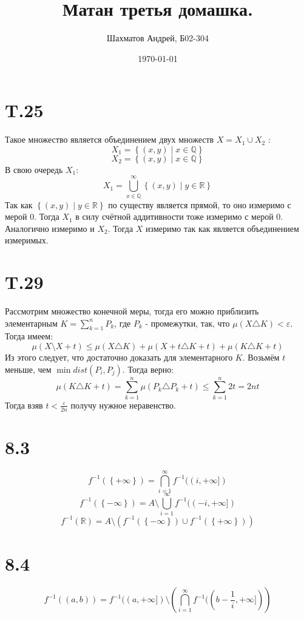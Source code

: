 \documentclass[12pt]{article}
\title{Матан третья домашка.}
\author{Шахматов Андрей, Б02-304}
\date{\today}
\begin{document}
\maketitle
\tableofcontents

\section{T.25}
Такое множество является объединением двух множеств $X = X_1 \cup X_2$ : 
\[
    X_1 = \left\{ (x, y) \mid x \in \mathbb{Q} \right\} 
\]
\[
    X_2 = \left\{ (x, y) \mid x \in \mathbb{Q} \right\}
\]
В свою очередь $X_1$:
\[
    X_1 = \bigcup_{x \in \mathbb{Q}}^{\infty} \left\{ (x, y) \mid y \in \mathbb{R} \right\}   
\]  
Так как $\left\{ (x, y) \mid y \in \mathbb{R} \right\}$ по существу является прямой, то оно измеримо 
с мерой $0$. Тогда $X_1$ в силу счётной аддитивности тоже измеримо с мерой $0$. Аналогично измеримо 
и $X_2$. Тогда $X$ измеримо так как является объединением измеримых.   
\section{T.29}
Рассмотрим множество конечной меры, тогда его можно приблизить элементарным $K = \sum_{k=1}^{n} P_k$, 
где $P_k$ - промежутки, так, что $\mu(X \triangle K) < \varepsilon$. 
Тогда имеем: 
\[
    \mu(X \setminus X + t) \leq \mu (X \triangle K) + \mu (X + t \triangle K + t) + \mu (K \triangle K + t)
\]   
Из этого следует, что достаточно доказать для элементарного $K$. Возьмём $t$ меньше, чем 
$\min dist(P_i, P_j)$. Тогда верно: 
\[
    \mu (K \triangle K + t) = \sum_{k=1}^{n} \mu (P_k \triangle P_k + t) \leq \sum_{k=1}^{n} 2t = 2nt
\]
Тогда взяв $t < \frac{\varepsilon}{2n}$ получу нужное неравенство.   

\section{8.3}
\[
    f^{-1}(\left\{ +\infty \right\} ) = \bigcap_{i=1}^{\infty} f^{-1}((i, +\infty] ) 
\] 
\[
    f^{-1}(\left\{ -\infty \right\} ) = A \setminus \bigcup_{i=1}^{\infty} f^{-1}((-i, +\infty ] ) 
\] 
\[
    f^{-1}(\mathbb{R}) = A \setminus \left( f^{-1}(\left\{ -\infty \right\} ) \cup f^{-1}(\left\{ +\infty \right\} ) \right) 
\]
\section{8.4}
\[
    f^{-1}((a, b)) = f^{-1}((a, +\infty]) \setminus \left( \bigcap_{i=1}^{\infty} f^{-1}((b - \frac{1}{i}, +\infty])  \right)   
\]
\end{document}
